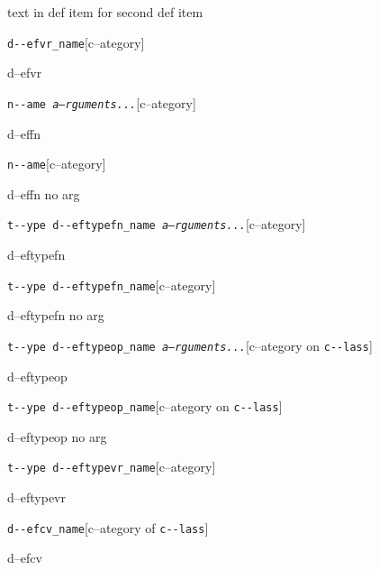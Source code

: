 \documentclass{book}
\begin{document}
\begin{titlepage}
%
text in def item for second def item


\noindent\texttt{d{-}{-}efvr\_name}\hfill[c--ategory]



%
d--efvr

\noindent\texttt{n{-}{-}ame \bgroup{}\normalfont{}\textsl{a--rguments...}\egroup{}}\hfill[c--ategory]



%
d--effn

\noindent\texttt{n{-}{-}ame}\hfill[c--ategory]



%
d--effn no arg

\noindent\texttt{t{-}{-}ype d{-}{-}eftypefn\_name \bgroup{}\normalfont{}\textsl{a--rguments...}\egroup{}}\hfill[c--ategory]



%
d--eftypefn

\noindent\texttt{t{-}{-}ype d{-}{-}eftypefn\_name}\hfill[c--ategory]



%
d--eftypefn no arg

\noindent\texttt{t{-}{-}ype d{-}{-}eftypeop\_name \bgroup{}\normalfont{}\textsl{a--rguments...}\egroup{}}\hfill[c--ategory on \texttt{c{-}{-}lass}]



%
d--eftypeop

\noindent\texttt{t{-}{-}ype d{-}{-}eftypeop\_name}\hfill[c--ategory on \texttt{c{-}{-}lass}]



%
d--eftypeop no arg

\noindent\texttt{t{-}{-}ype d{-}{-}eftypevr\_name}\hfill[c--ategory]



%
d--eftypevr

\noindent\texttt{d{-}{-}efcv\_name}\hfill[c--ategory of \texttt{c{-}{-}lass}]



%
d--efcv


\end{titlepage}
\end{document}
